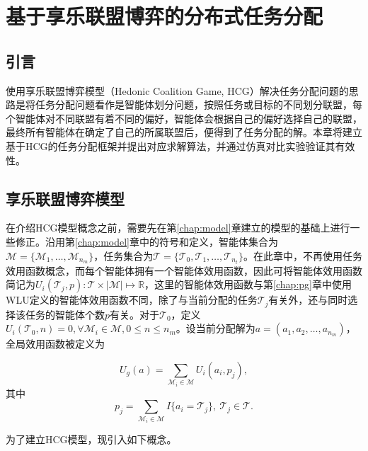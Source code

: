 
\chapter{基于享乐联盟博弈的分布式任务分配}
\label{chap:hedonic}

\section{引言}
\label{hg:sec:intro}

使用享乐联盟博弈模型（Hedonic Coalition Game, HCG）解决任务分配问题的思路是将任务分配问题看作是智能体划分问题，按照任务或目标的不同划分联盟，每个智能体对不同联盟有着不同的偏好，智能体会根据自己的偏好选择自己的联盟，最终所有智能体在确定了自己的所属联盟后，便得到了任务分配的解。本章将建立基于HCG的任务分配框架并提出对应求解算法，并通过仿真对比实验验证其有效性。


\section{享乐联盟博弈模型}
\label{hg:sec:hgmodel}

在介绍HCG模型概念之前，需要先在第\ref{chap:model}章建立的模型的基础上进行一些修正。沿用第\ref{chap:model}章中的符号和定义，智能体集合为$\mathcal{M}=\{\mathcal{M}_1,\dots,\mathcal{M}_{n_m}\}$，任务集合为$\mathcal{T} = \{\mathcal{T}_0,\mathcal{T}_1,\dots,\mathcal{T}_{n_t}\}$。在此章中，不再使用任务效用函数概念，而每个智能体拥有一个智能体效用函数，因此可将智能体效用函数简记为$U_i(\mathcal{T}_j,p):\mathcal{T} \times |\mathcal{M}| \mapsto \mathbb{R}$，这里的智能体效用函数与第\ref{chap:pg}章中使用WLU定义的智能体效用函数不同，除了与当前分配的任务$\mathcal{T}_j$有关外，还与同时选择该任务的智能体个数$p$有关。对于$\mathcal{T}_0$，定义$U_i(\mathcal{T}_0,n)=0,\forall \mathcal{M}_i \in \mathcal{M}, 0 \leq n \leq n_m$。设当前分配解为$a=(a_1,a_2,\dots,a_{n_m})$，全局效用函数被定义为

\begin{equation}
\label{hcg:eq:gloablU}
	U_g(a) = \sum_{\mathcal{M}_i \in \mathcal{M}} U_i(a_i,p_j),
\end{equation}
其中
\begin{equation}
\label{hcg:eq:parcitipants}
	p_j = \sum_{\mathcal{M}_i \in \mathcal{M}} I\{a_i = \mathcal{T}_j\},\ \mathcal{T}_j \in \mathcal{T}.
\end{equation}

为了建立HCG模型，现引入如下概念。

